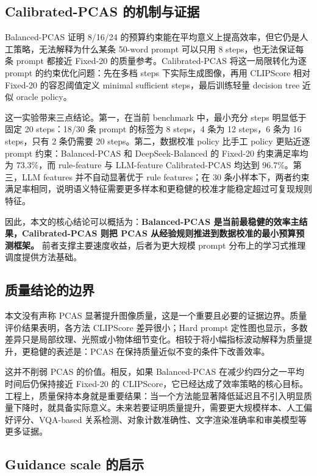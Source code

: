 \documentclass[UTF8,zihao=-4,fontset=fandol]{ctexart}
\newcommand{\clipscore}{\textrm{CLIPScore}}
\begin{document}
\subsection{Calibrated-PCAS 的机制与证据}

Balanced-PCAS 证明 8/16/24 的预算约束能在平均意义上提高效率，但它仍是人工策略，无法解释为什么某条 50-word prompt 可以只用 8 steps，也无法保证每条 prompt 都接近 Fixed-20 的质量参考。Calibrated-PCAS 将这一局限转化为逐 prompt 的约束优化问题：先在多档 steps 下实际生成图像，再用 \clipscore{} 相对 Fixed-20 的容忍阈值定义 minimal sufficient steps，最后训练轻量 decision tree 近似 oracle policy。

这一实验带来三点结论。第一，在当前 benchmark 中，最小充分 steps 明显低于固定 20 steps：18/30 条 prompt 的标签为 8 steps，4 条为 12 steps，6 条为 16 steps，只有 2 条仍需要 20 steps。第二，数据校准 policy 比手工 policy 更贴近逐 prompt 约束：Balanced-PCAS 和 DeepSeek-Balanced 的 Fixed-20 约束满足率均为 73.3\%，而 rule-feature 与 LLM-feature Calibrated-PCAS 均达到 96.7\%。第三，LLM features 并不自动显著优于 rule features；在 30 条小样本下，两者约束满足率相同，说明语义特征需要更多样本和更稳健的校准才能稳定超过可复现规则特征。

因此，本文的核心结论可以概括为：\textbf{Balanced-PCAS 是当前最稳健的效率主结果，Calibrated-PCAS 则把 PCAS 从经验规则推进到数据校准的最小预算预测框架。} 前者支撑主要速度收益，后者为更大规模 prompt 分布上的学习式推理调度提供方法基础。

\subsection{质量结论的边界}

本文没有声称 PCAS 显著提升图像质量，这是一个重要且必要的证据边界。质量评价结果表明，各方法 \clipscore{} 差异很小；Hard prompt 定性图也显示，多数差异只是局部纹理、光照或小物体细节变化。相较于将小幅指标波动解释为质量提升，更稳健的表述是：PCAS 在保持质量近似不变的条件下改善效率。

这并不削弱 PCAS 的价值。相反，如果 Balanced-PCAS 在减少约四分之一平均时间后仍保持接近 Fixed-20 的 \clipscore{}，它已经达成了效率策略的核心目标。工程上，质量保持本身就是重要结果：当一个方法能显著降低延迟且不引入明显质量下降时，就具备实际意义。未来若要证明质量提升，需要更大规模样本、人工偏好评分、VQA-based 关系检测、对象计数准确性、文字渲染准确率和审美模型等更多证据。

\subsection{Guidance scale 的启示}
\end{document}
